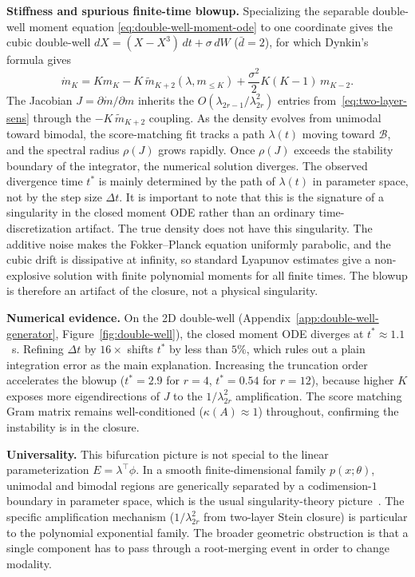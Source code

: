 \documentclass{article}
\theoremstyle{definition}
\begin{document}
\textbf{Stiffness and spurious finite-time blowup.}
Specializing the separable double-well moment equation
\eqref{eq:double-well-moment-ode} to one coordinate gives the cubic
double-well
$dX = (X - X^3)\,dt + \sigma\,dW$ ($\bar{d} = 2$),
for which Dynkin's formula gives
\begin{equation}\label{eq:dw-moment-ode}
  \dot{m}_K = Km_K - K\,\widetilde{m}_{K+2}(\lambda, m_{\le K})
            + \frac{\sigma^2}{2}K(K{-}1)\,m_{K-2}.
\end{equation}
The Jacobian $J = \partial\dot{m}/\partial m$
inherits the $O(\lambda_{2r-1}/\lambda_{2r}^2)$
entries from~\eqref{eq:two-layer-sens} through the
$-K\,\widetilde{m}_{K+2}$ coupling.
As the density evolves from unimodal toward bimodal, the score-matching
fit tracks a path $\lambda(t)$ moving toward $\mathcal{B}$, and the
spectral radius $\rho(J)$ grows rapidly.
Once $\rho(J)$ exceeds the stability boundary of the integrator,
the numerical solution diverges.
The observed divergence time $t^*$ is mainly determined by the path of
$\lambda(t)$ in parameter space, not by the step size $\Delta t$. It is important to note that this is
the signature of a singularity in the closed moment ODE rather than an
ordinary time-discretization artifact.
The true density does not have this singularity. The additive noise makes
the Fokker--Planck equation uniformly parabolic, and the cubic drift is
dissipative at infinity, so standard Lyapunov estimates give a
non-explosive solution with finite polynomial moments for all finite
times. The blowup is therefore an artifact of the closure, not a
physical singularity.

\textbf{Numerical evidence.}
On the 2D double-well
(Appendix~\ref{app:double-well-generator},
Figure~\ref{fig:double-well}),
the closed moment ODE diverges at $t^* \approx 1.1$~s.
Refining $\Delta t$ by $16\times$ shifts $t^*$ by less than $5\%$,
which rules out a plain integration error as the main explanation.
Increasing the truncation order accelerates the blowup
($t^*{=}2.9$ for $r{=}4$, $t^*{=}0.54$ for $r{=}12$),
because higher $K$ exposes more eigendirections of $J$ to
the $1/\lambda_{2r}^2$ amplification.
The score matching Gram matrix remains well-conditioned
($\kappa(A) \approx 1$) throughout,
confirming the instability is in the closure.

\textbf{Universality.}
This bifurcation picture is not special to the linear parameterization
$E=\lambda^\top\phi$. In a smooth finite-dimensional family
$p(x;\theta)$, unimodal and bimodal regions are generically separated by
a codimension-$1$ boundary in parameter space, which is the usual
singularity-theory picture~\cite{thom1975}.
The specific amplification mechanism
($1/\lambda_{2r}^2$ from two-layer Stein closure)
is particular to the polynomial exponential family. The broader
geometric obstruction is that a single component has to pass through a
root-merging event in order to change modality.
\end{document}
